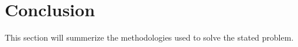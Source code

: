 \section {Conclusion}

This section will summerize the methodologies used to solve the stated problem.
